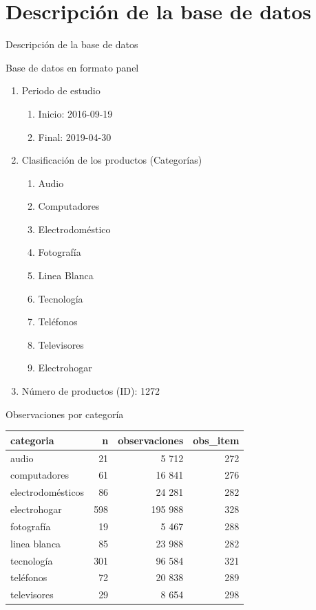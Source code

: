 \documentclass[xcolor=dvipsnames]{beamer}
\begin{document}
\section{Descripci\'on de la base de datos}
\begin{frame}
Descripci\'on de la base de datos
\end{frame}
\begin{frame}
Base de datos en formato panel
\begin{enumerate}[I]
\item Periodo de estudio
\begin{enumerate}[i]
  \item Inicio: 2016-09-19
  \item Final: 2019-04-30
\end{enumerate}
\item Clasificaci\'on de los productos (Categor\'ias)
\begin{enumerate}[i]
  \item Audio
  \item Computadores
  \item Electrodom\'estico
  \item Fotograf\'ia
  \item Linea Blanca
  \item Tecnolog\'ia
  \item Tel\'efonos
  \item Televisores
  \item Electrohogar
\end{enumerate}
\item N\'umero de productos (ID): 1272
\end{enumerate}
\end{frame}

\begin{frame}
Observaciones por categor\'ia
\centering
\begin{tabular}{lrrr}
\toprule
categoria & n & observaciones & obs\_item\\
\midrule
audio & 21 & 5 712 & 272\\
computadores & 61 & 16 841 & 276\\
electrodom\'esticos & 86 & 24 281 & 282\\
electrohogar & 598 & 195 988 & 328\\
fotograf\'ia & 19 & 5 467 & 288\\
\addlinespace
linea blanca & 85 & 23 988 & 282\\
tecnolog\'ia & 301 & 96 584 & 321\\
tel\'efonos & 72 & 20 838 & 289\\
televisores & 29 & 8 654 & 298\\
\bottomrule
\end{tabular}
\end{frame}
\end{document}
